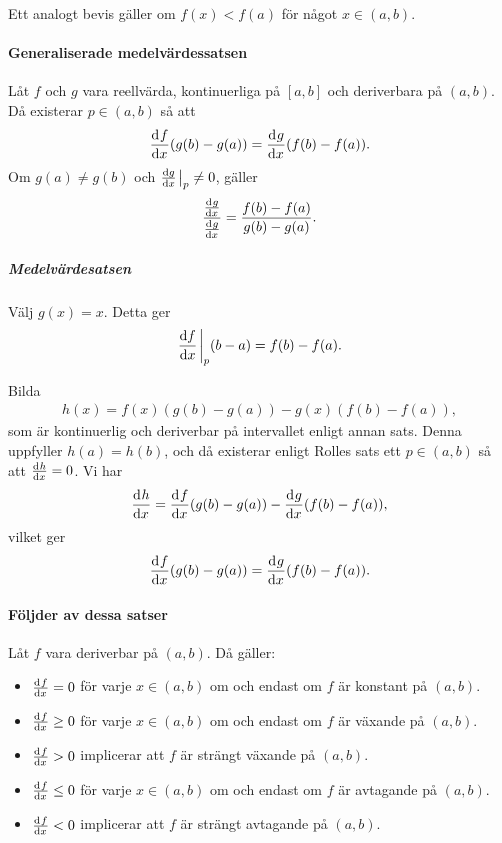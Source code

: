 Ett analogt bevis gäller om $f(x) < f(a)$ för något $x\in (a, b)$.

\paragraph{Generaliserade medelvärdessatsen}
Låt $f$ och $g$ vara reellvärda, kontinuerliga på $[a, b]$ och deriverbara på $(a, b)$. Då existerar $p\in (a, b)$ så att
\begin{align*}
	\dv[]{f}{x} (p)(g(b) - g(a)) = \dv[]{g}{x} (p)(f(b) - f(a)).
\end{align*}
Om $g(a)\neq g(b)$ och $\dv{g}{x}\eval_p\neq 0$, gäller
\begin{align*}
	\frac{\dv[]{g}{x} (p)}{\dv[]{g}{x} (p)} = \frac{f(b) - f(a)}{g(b) - g(a)}.
\end{align*}

\subparagraph{Medelvärdesatsen}
Välj $g(x) = x$. Detta ger
\begin{align*}
	\dv{f}{x}\eval_p(b - a) = f(b) - f(a).
\end{align*}

\proof
Bilda
\begin{align*}
	h(x) = f(x)(g(b) - g(a)) - g(x)(f(b) - f(a)),
\end{align*}
som är kontinuerlig och deriverbar på intervallet enligt annan sats. Denna uppfyller $h(a) = h(b)$, och då existerar enligt Rolles sats ett $p\in (a, b)$ så att $\dv[]{h}{x} (p) = 0$. Vi har
\begin{align*}
	\dv[]{h}{x} (x) = \dv[]{f}{x} (x)(g(b) - g(a)) - \dv[]{g}{x} (x)(f(b) - f(a)),
\end{align*}
vilket ger
\begin{align*}
	\dv[]{f}{x} (p)(g(b) - g(a)) = \dv[]{g}{x} (p)(f(b) - f(a)).
\end{align*}

\paragraph{Följder av dessa satser}
Låt $f$ vara deriverbar på $(a, b)$. Då gäller:
\begin{itemize}
	\item $\dv[]{f}{x} (x) = 0$ för varje $x\in (a, b)$ om och endast om $f$ är konstant på $(a, b)$.
	\item $\dv[]{f}{x} (x)\geq 0$ för varje $x\in (a, b)$ om och endast om $f$ är växande på $(a, b)$.
	\item $\dv[]{f}{x} (x) > 0$ implicerar att $f$ är strängt växande på $(a, b)$.
	\item $\dv[]{f}{x} (x)\leq 0$ för varje $x\in (a, b)$ om och endast om $f$ är avtagande på $(a, b)$.
	\item $\dv[]{f}{x} (x) < 0$ implicerar att $f$ är strängt avtagande på $(a, b)$.
\end{itemize}

